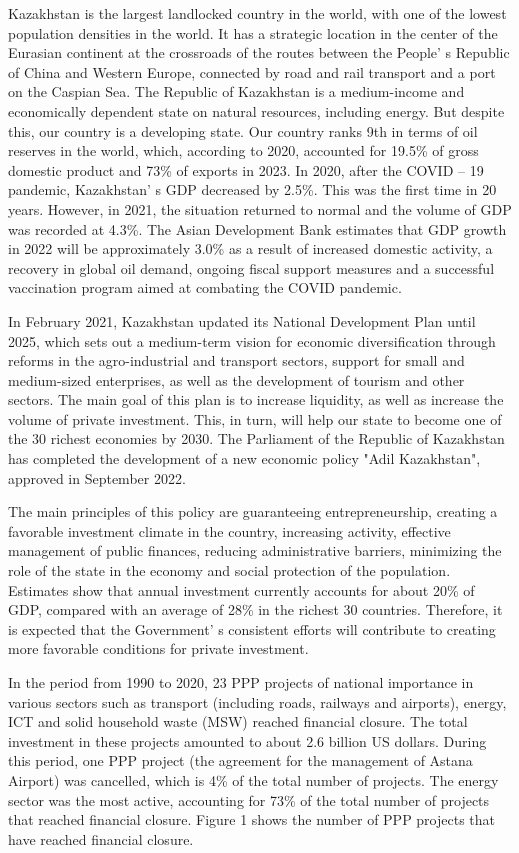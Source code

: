 \begin{multicols}{2}
Kazakhstan is the largest landlocked country in the world, with one of
the lowest population densities in the world. It has a strategic
location in the center of the Eurasian continent at the crossroads of
the routes between the People' s Republic of China and
Western Europe, connected by road and rail transport and a port on the
Caspian Sea. The Republic of Kazakhstan is a medium-income and
economically dependent state on natural resources, including energy. But
despite this, our country is a developing state. Our country ranks 9th
in terms of oil reserves in the world, which, according to 2020,
accounted for 19.5\% of gross domestic product and 73\% of exports in
2023. In 2020, after the COVID -- 19 pandemic, Kazakhstan' s
GDP decreased by 2.5\%. This was the first time in 20 years. However, in
2021, the situation returned to normal and the volume of GDP was
recorded at 4.3\%. The Asian Development Bank estimates that GDP growth
in 2022 will be approximately 3.0\% as a result of increased domestic
activity, a recovery in global oil demand, ongoing fiscal support
measures and a successful vaccination program aimed at combating the
COVID pandemic.

In February 2021, Kazakhstan updated its National Development Plan until
2025, which sets out a medium-term vision for economic diversification
through reforms in the agro-industrial and transport sectors, support
for small and medium-sized enterprises, as well as the development of
tourism and other sectors. The main goal of this plan is to increase
liquidity, as well as increase the volume of private investment. This,
in turn, will help our state to become one of the 30 richest economies
by 2030. The Parliament of the Republic of Kazakhstan has completed the
development of a new economic policy "Adil Kazakhstan", approved in
September 2022.

The main principles of this policy are guaranteeing entrepreneurship,
creating a favorable investment climate in the country, increasing
activity, effective management of public finances, reducing
administrative barriers, minimizing the role of the state in the economy
and social protection of the population. Estimates show that annual
investment currently accounts for about 20\% of GDP, compared with an
average of 28\% in the richest 30 countries. Therefore, it is expected
that the Government' s consistent efforts will contribute
to creating more favorable conditions for private investment.

In the period from 1990 to 2020, 23 PPP projects of national importance
in various sectors such as transport (including roads, railways and
airports), energy, ICT and solid household waste (MSW) reached financial
closure. The total investment in these projects amounted to about 2.6
billion US dollars. During this period, one PPP project (the agreement
for the management of Astana Airport) was cancelled, which is 4\% of the
total number of projects. The energy sector was the most active,
accounting for 73\% of the total number of projects that reached
financial closure. Figure 1 shows the number of PPP projects that have
reached financial closure.


\end{multicols}
